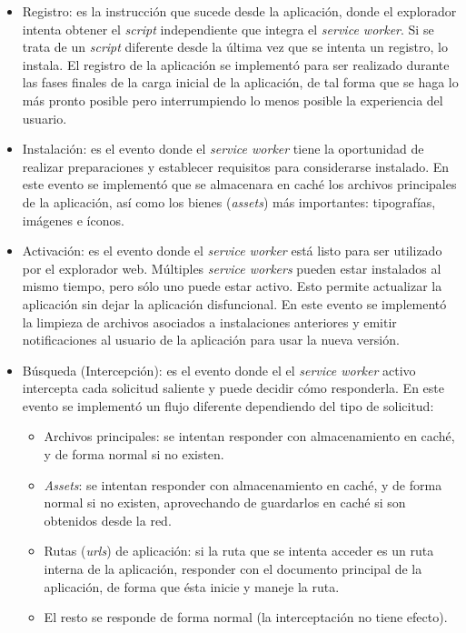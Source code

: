 \begin{itemize}
  \item Registro: es la instrucción que sucede desde la aplicación, donde el explorador intenta obtener el \textit{script} independiente que integra el \textit{service worker}. Si se trata de un \textit{script} diferente desde la última vez que se intenta un registro, lo instala. El registro de la aplicación se implementó para ser realizado durante las fases finales de la carga inicial de la aplicación, de tal forma que se haga lo más pronto posible pero interrumpiendo lo menos posible la experiencia del usuario.

  \item Instalación: es el evento donde el \textit{service worker} tiene la oportunidad de realizar preparaciones y establecer requisitos para considerarse instalado. En este evento se implementó que se almacenara en caché los archivos principales de la aplicación, así como los bienes (\textit{assets}) más importantes: tipografías, imágenes e íconos.

  \item Activación: es el evento donde el \textit{service worker} está listo para ser utilizado por el explorador web. Múltiples \textit{service workers} pueden estar instalados al mismo tiempo, pero sólo uno puede estar activo. Esto permite actualizar la aplicación sin dejar la aplicación disfuncional. En este evento se implementó la limpieza de archivos asociados a instalaciones anteriores y emitir notificaciones al usuario de la aplicación para usar la nueva versión.

  \item{
    Búsqueda (Intercepción): es el evento donde el el \textit{service worker} activo intercepta cada solicitud saliente y puede decidir cómo responderla. En este evento se implementó un flujo diferente dependiendo del tipo de solicitud:

    \begin{itemize}
      \item Archivos principales: se intentan responder con almacenamiento en caché, y de forma normal si no existen.
      \item \textit{Assets}: se intentan responder con almacenamiento en caché, y de forma normal si no existen, aprovechando de guardarlos en caché si son obtenidos desde la red.
      \item Rutas (\textit{urls}) de aplicación: si la ruta que se intenta acceder es un ruta interna de la aplicación, responder con el documento principal de la aplicación, de forma que ésta inicie y maneje la ruta.
      \item El resto se responde de forma normal (la interceptación no tiene efecto).
    \end{itemize}
  }
\end{itemize}

